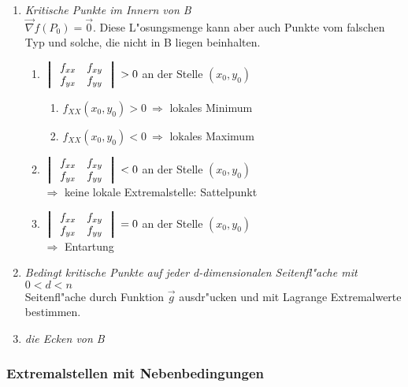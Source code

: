 \documentclass[10pt, a4paper, twocolumn]{scrartcl}
\begin{document}
\begin{enumerate}
 \item \textit{Kritische Punkte im Innern von B}\\
  $\vec{\nabla}f(P_0)=\vec{0}$. Diese L"osungsmenge kann aber auch Punkte vom falschen Typ und solche, die nicht in B liegen beinhalten.
  \begin{enumerate}
   \item
    $\left \bracevert
    \begin{array}{cc}
     f_{xx} & f_{xy} \\
     f_{yx} & f_{yy}
    \end{array}
    \right \bracevert > 0$ an der Stelle $(x_0,y_0)$
    \begin{enumerate}
     \item $f_{XX}(x_0,y_0)>0\:\Rightarrow$ lokales Minimum
     \item $f_{XX}(x_0,y_0)<0\:\Rightarrow$ lokales Maximum
    \end{enumerate}
   \item 
    $\left \bracevert
    \begin{array}{cc}
     f_{xx} & f_{xy} \\
     f_{yx} & f_{yy}
    \end{array}
    \right \bracevert < 0$ an der Stelle $(x_0,y_0)$\\
    $\Rightarrow$ keine lokale Extremalstelle: Sattelpunkt
   \item
    $\left \bracevert
    \begin{array}{cc}
     f_{xx} & f_{xy} \\
     f_{yx} & f_{yy}
    \end{array}
    \right \bracevert = 0$ an der Stelle $(x_0,y_0)$\\
    $\Rightarrow$ Entartung
  \end{enumerate}
 \item \textit{Bedingt kritische Punkte auf jeder d-dimensionalen Seitenfl"ache mit $0<d<n$}\\
  Seitenfl"ache durch Funktion $\vec{g}$ ausdr"ucken und mit Lagrange Extremalwerte bestimmen.
 \item \textit{die Ecken von B}
\end{enumerate}

\subsubsection{Extremalstellen mit Nebenbedingungen}
\end{document}
